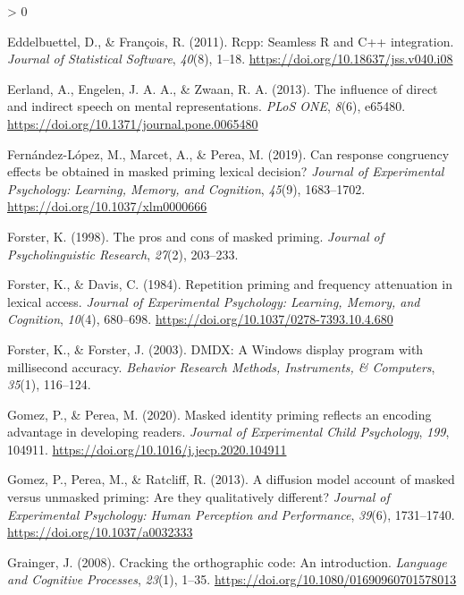 \documentclass[
  english,
  man,floatsintext]{apa6}
\newlength{\cslhangindent}
\newenvironment{CSLReferences}[2] %
 {%
  \setlength{\parindent}{0pt}
  \ifodd #1 \everypar{\setlength{\hangindent}{\cslhangindent}}\ignorespaces\fi
  \ifnum #2 > 0
  \setlength{\parskip}{#2\baselineskip}
  \fi
 }%
 {}
\begin{document}
\begin{CSLReferences}{1}{0}
\leavevmode\hypertarget{ref-R-Rcpp_a}{}%
Eddelbuettel, D., \& François, R. (2011). {Rcpp}: Seamless {R} and {C++} integration. \emph{Journal of Statistical Software}, \emph{40}(8), 1--18. \url{https://doi.org/10.18637/jss.v040.i08}

\leavevmode\hypertarget{ref-eerland2013influence}{}%
Eerland, A., Engelen, J. A. A., \& Zwaan, R. A. (2013). The influence of direct and indirect speech on mental representations. \emph{{PLoS} {ONE}}, \emph{8}(6), e65480. \url{https://doi.org/10.1371/journal.pone.0065480}

\leavevmode\hypertarget{ref-Fern_ndez_L_pez_2019}{}%
Fernández-López, M., Marcet, A., \& Perea, M. (2019). Can response congruency effects be obtained in masked priming lexical decision? \emph{Journal of Experimental Psychology: Learning, Memory, and Cognition}, \emph{45}(9), 1683--1702. \url{https://doi.org/10.1037/xlm0000666}

\leavevmode\hypertarget{ref-forster1998pros}{}%
Forster, K. (1998). The pros and cons of masked priming. \emph{Journal of Psycholinguistic Research}, \emph{27}(2), 203--233.

\leavevmode\hypertarget{ref-forsterRepetitionPrimingFrequency1984}{}%
Forster, K., \& Davis, C. (1984). Repetition priming and frequency attenuation in lexical access. \emph{Journal of Experimental Psychology: Learning, Memory, and Cognition}, \emph{10}(4), 680--698. \url{https://doi.org/10.1037/0278-7393.10.4.680}

\leavevmode\hypertarget{ref-forsterDMDXWindowsDisplay2003}{}%
Forster, K., \& Forster, J. (2003). {DMDX}: {A Windows} display program with millisecond accuracy. \emph{Behavior Research Methods, Instruments, \& Computers}, \emph{35}(1), 116--124.

\leavevmode\hypertarget{ref-Gomez_2020}{}%
Gomez, P., \& Perea, M. (2020). Masked identity priming reflects an encoding advantage in developing readers. \emph{Journal of Experimental Child Psychology}, \emph{199}, 104911. \url{https://doi.org/10.1016/j.jecp.2020.104911}

\leavevmode\hypertarget{ref-gomezDiffusionModelAccount2013}{}%
Gomez, P., Perea, M., \& Ratcliff, R. (2013). A diffusion model account of masked versus unmasked priming: {Are} they qualitatively different? \emph{Journal of Experimental Psychology: Human Perception and Performance}, \emph{39}(6), 1731--1740. \url{https://doi.org/10.1037/a0032333}

\leavevmode\hypertarget{ref-grainger2008cracking}{}%
Grainger, J. (2008). Cracking the orthographic code: An introduction. \emph{Language and Cognitive Processes}, \emph{23}(1), 1--35. \url{https://doi.org/10.1080/01690960701578013}


\end{CSLReferences}
\end{document}
